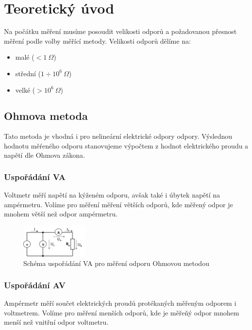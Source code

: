 \documentclass[a4paper, czech]{article}
\begin{document}
\section{Teoretický úvod}

Na počátku měření musíme posoudit velikosti odporů a požadovanou přesnost měření podle volby měřící metody.
Velikosti odporů dělíme na:
\begin{itemize}
    \item malé ($<1\ \Omega$)
    \item střední ($1 \div 10^6\ \Omega$)
    \item velké ($> 10^6\ \Omega$)
\end{itemize}

\subsection{Ohmova metoda}

Tato metoda je vhodná i pro nelineární elektrické odpory odpory.
Výslednou hodnotu měŕeného odporu stanovujeme výpočtem z hodnot elektrického proudu a napětí dle Ohmova zákona.

\subsubsection{Uspořádání VA}

Voltmetr měří napětí na kýženém odporu, avšak také i úbytek napětí na ampérmetru.
Volíme pro měření měření větších odporů, kde měřený odpor je mnohem větší než odpor ampérmetru.

\begin{figure}[H]
    \centering
    \includegraphics[width=0.3\textwidth]{schema1.png}
    \caption{Schéma uspořádání VA pro měření odporu Ohmovou metodou}
\end{figure}

\subsubsection{Uspořádání AV}

Ampérmetr měří součet elektrických proudů protékaných měřeným odporem i voltmetrem. 
Volíme pro měření menších odporů, kde je měřeňý odpor mnohem menší než vnitřní odpor voltmetru.
\end{document}
